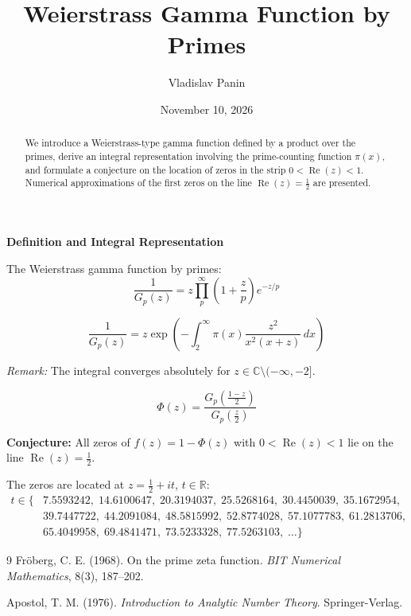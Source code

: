\documentclass[12pt,a4paper]{article}
\title{Weierstrass Gamma Function by Primes}
\author{Vladislav Panin}
\date{November 10, 2026}
\begin{document}
\maketitle

\begin{abstract}
\noindent
We introduce a Weierstrass-type gamma function defined by a product over the primes,
derive an integral representation involving the prime-counting function $\pi(x)$,
and formulate a conjecture on the location of zeros in the strip $0 < \operatorname{Re}(z) < 1$.
Numerical approximations of the first zeros on the line $\operatorname{Re}(z) = \frac{1}{2}$ are presented.
\end{abstract}

\begin{center}
{\large\bfseries Definition and Integral Representation}
\end{center}

The Weierstrass gamma function by primes:
\begin{equation*}
    \frac{1}{G_p(z)} = z \prod_{p}^{\infty} \left( 1 + \frac{z}{p} \right) e^{-z/p}
\end{equation*}

\begin{equation*}
    \frac{1}{G_p(z)} = z \exp\left( - \int_{2}^{\infty} \pi(x) \frac{z^2}{x^2(x+z)} \, dx \right)
\end{equation*}

\textit{Remark:} The integral converges absolutely for $z \in \mathbb{C} \setminus (-\infty, -2]$.

\begin{equation*}
    \Phi(z) = \frac{G_p\left(\frac{1 - z}{2}\right)}{G_p\left(\frac{z}{2}\right)}
\end{equation*}

\textbf{Conjecture:} All zeros of $f(z) = 1 - \Phi(z)$ with $0 < \operatorname{Re}(z) < 1$ lie on the line $\operatorname{Re}(z) = \frac{1}{2}$.

The zeros are located at $z = \frac{1}{2} + it$, $t \in \mathbb{R}$:
\begin{align*}
    t \in \{ &7.5593242,\; 14.6100647,\; 20.3194037,\; 25.5268164,\; 30.4450039,\; 35.1672954, \\
    &39.7447722,\; 44.2091084,\; 48.5815992,\; 52.8774028,\; 57.1077783,\; 61.2813706, \\
    &65.4049958,\; 69.4841471,\; 73.5233328,\; 77.5263103,\; \dots \}
\end{align*}

\begin{thebibliography}{9}
Fr\"oberg, C. E. (1968). 
\newblock On the prime zeta function.
\newblock \emph{BIT Numerical Mathematics}, 8(3), 187--202.

Apostol, T. M. (1976). 
\newblock \emph{Introduction to Analytic Number Theory}. 
\newblock Springer-Verlag.
\end{thebibliography}
\end{document}
